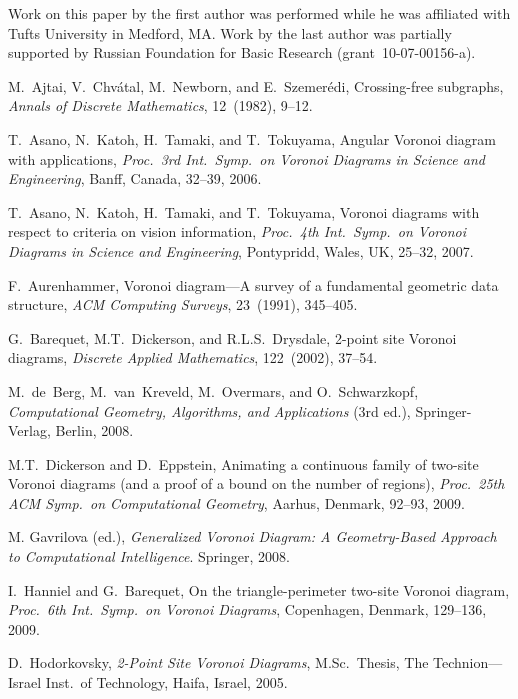 \documentclass[10pt, conference, compsocconf]{IEEEtran}
\begin{document}
Work on this paper by the first author was performed while he was
affiliated with Tufts University in Medford, MA.
Work by the last author was partially supported by
Russian Foundation for Basic Research (grant~10-07-00156-a).



\begin{thebibliography}{99}



{\sc M.~Ajtai, V.~Chv\'{a}tal, M.~Newborn, and E.~Szemer\'{e}di},
Crossing-free subgraphs,
\emph{Annals of Discrete Mathematics},
12~(1982), 9--12.

{\sc T.~Asano, N.~Katoh, H.~Tamaki, and T.~Tokuyama},
Angular Voronoi diagram with applications,
\emph{Proc.\ 3rd Int.\ Symp.\ on Voronoi Diagrams in Science and Engineering},
Banff, Canada, 32--39, 2006.

{\sc T.~Asano, N.~Katoh, H.~Tamaki, and T.~Tokuyama},
Voronoi diagrams with respect to criteria on vision information,
\emph{Proc.\ 4th Int.\ Symp.\ on Voronoi Diagrams in Science and Engineering},
Pontypridd, Wales, UK, 25--32, 2007.

{\sc F.~Aurenhammer},
Voronoi diagram---A survey of a fundamental geometric data structure,
\emph{ACM Computing Surveys},
23~(1991), 345--405.

{\sc G.~Barequet, M.T.~Dickerson, and R.L.S.~Drysdale},
2-point site Voronoi diagrams,
\emph{Discrete Applied Mathematics},
122~(2002), 37--54.

{\sc M.~de~Berg, M.~van~Kreveld, M.~Overmars, and O.~Schwarzkopf},
\emph{Computational Geometry, Algorithms, and Applications} (3rd ed.),
Springer-Verlag, Berlin, 2008.

{\sc M.T.~Dickerson and D.~Eppstein},
Animating a continuous family of two-site Voronoi diagrams (and a proof of
a bound on the number of regions),
\emph{Proc.\ 25th ACM Symp.\ on Computational Geometry},
Aarhus, Denmark, 92--93, 2009.

{\sc M. Gavrilova (ed.)},
\emph{Generalized Voronoi Diagram: A Geometry-Based Approach to
Computational Intelligence}.
Springer, 2008.

{\sc I.~Hanniel and G.~Barequet},
On the triangle-perimeter two-site Voronoi diagram,
{\it Proc.\ 6th Int.\ Symp.\ on Voronoi Diagrams},
Copenhagen, Denmark, 129--136, 2009.

{\sc D.~Hodorkovsky},
\emph{2-Point Site Voronoi Diagrams},
M.Sc.\ Thesis,
The Technion---Israel Inst.\ of Technology,
Haifa, Israel, 2005.


\end{thebibliography}
\end{document}
